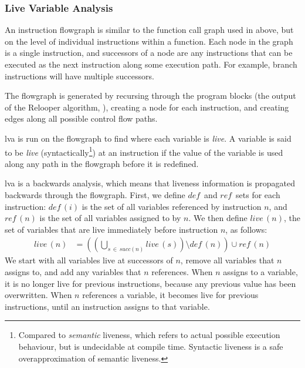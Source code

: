 \documentclass[00-main.tex]{subfiles}
\begin{document}
\subsubsection{Live Variable Analysis}

\newcommand{\lvadef}{\ensuremath{\mathit{def}}}
\newcommand{\lvaref}{\ensuremath{\mathit{ref}}}

An instruction flowgraph is similar to the function call graph used in  above, but on the level of individual instructions within a function.
Each node in the graph is a single instruction, and successors of a node are any instructions that can be executed as the next instruction along some execution path.
For example, branch instructions will have multiple successors.

The flowgraph is generated by recursing through the program blocks (the output of the Relooper algorithm, ), creating a node for each instruction, and creating edges along all possible control flow paths.

\Gls{lva} is run on the flowgraph to find where each variable is \emph{live}.
A variable is said to be \emph{live} (syntactically\footnote{Compared to \emph{semantic} liveness, which refers to actual possible execution behaviour, but is undecidable at compile time. Syntactic liveness is a safe overapproximation of semantic liveness.}) at an instruction if the value of the variable is used along any path in the flowgraph before it is redefined.

\Gls{lva} is a backwards analysis, which means that liveness information is propagated backwards through the flowgraph.
First, we define \lvadef\ and \lvaref\ sets for each instruction: $\lvadef\,(i)$ is the set of all variables referenced by instruction $n$, and $\lvaref\,(n)$ is the set of all variables assigned to by $n$.
We then define $\mathit{live}\,(n)$, the set of variables that are live immediately before instruction $n$, as follows:
\begin{align*}
  \mathit{live}\,(n) &= \left( \left( \bigcup_{s \,\in\, \mathit{succ}(n)} \mathit{live}\,(s) \right) \setminus \lvadef\,(n) \right) \cup \lvaref\,(n)
\end{align*}
We start with all variables live at successors of $n$, remove all variables that $n$ assigns to, and add any variables that $n$ references.
When $n$ assigns to a variable, it is no longer live for previous instructions, because any previous value has been overwritten.
When $n$ references a variable, it becomes live for previous instructions, until an instruction assigns to that variable.
\end{document}
